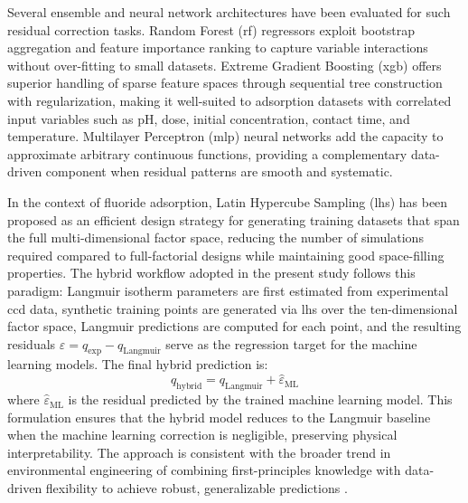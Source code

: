  Several ensemble and neural network architectures have been evaluated for such
 residual correction tasks. Random Forest (\gls{rf}) regressors exploit bootstrap
 aggregation and feature importance ranking to capture variable interactions without
 over-fitting to small datasets. Extreme Gradient Boosting (\gls{xgb}) offers
 superior handling of sparse feature spaces through sequential tree construction with
 regularization, making it well-suited to adsorption datasets with correlated input
 variables such as pH, dose, initial concentration, contact time, and temperature.
 Multilayer Perceptron (\gls{mlp}) neural networks add the capacity to approximate
 arbitrary continuous functions, providing a complementary data-driven component when
 residual patterns are smooth and systematic.

 In the context of fluoride adsorption, Latin Hypercube Sampling (\gls{lhs}) has been
 proposed as an efficient design strategy for generating training datasets that span
 the full multi-dimensional factor space, reducing the number of simulations required
 compared to full-factorial designs while maintaining good space-filling properties.
 The hybrid workflow adopted in the present study follows this paradigm: Langmuir
 isotherm parameters are first estimated from experimental \gls{ccd} data, synthetic
 training points are generated via \gls{lhs} over the ten-dimensional factor space,
 Langmuir predictions are computed for each point, and the resulting residuals
 $\varepsilon = q_{\text{exp}} - q_{\text{Langmuir}}$ serve as the regression target
 for the machine learning models. The final hybrid prediction is:
 \begin{equation}
     q_{\text{hybrid}} = q_{\text{Langmuir}} + \hat{\varepsilon}_{\text{ML}}
 \end{equation}
 where $\hat{\varepsilon}_{\text{ML}}$ is the residual predicted by the trained
 machine learning model. This formulation ensures that the hybrid model reduces to
 the Langmuir baseline when the machine learning correction is negligible, preserving
 physical interpretability. The approach is consistent with the broader trend in
 environmental engineering of combining first-principles knowledge with data-driven
 flexibility to achieve robust, generalizable predictions \cite{Hiremath2024}.
 
